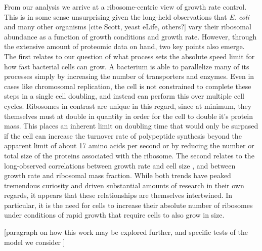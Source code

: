 From our analysis we arrive at a ribosome-centric view of growth rate control.
This is in some sense unsurprising  given the long-held observations that
\textit{E. coli} and many other organisms [cite Scott, yeast eLife, others?]
vary their ribosomal abundance as a function of growth conditions and growth
rate. However, through the extensive amount of proteomic data on hand, two key
points also emerge. The first relates to our question of what process sets the
absolute speed limit for how fast bacterial cells can grow.  A bacterium is able
to parallelize many of its processes simply by increasing the number of
transporters and  enzymes.  Even in cases like chromosomal replication, the cell
is not constrained to complete these steps in a single cell doubling, and
instead can perform this over multiple  cell cycles. Ribosomes in contrast are
unique in this regard, since at minimum, they themselves  must at double in
quantity in order for the cell to double it's protein mass. This places an
inherent limit on doubling time that would only be surpased if the cell can
increase the turnover rate of   polypeptide synthesis beyond the apparent limit
of about 17 amino acids per second  or by reducing the number or total size of
the proteins associated with the ribosome. The second relates to the
long-observed correlations between growth rate and cell size
\citep{schaechter1958, si2017}, and between growth rate and ribosomal mass
fraction. While both trends have peaked tremendous curiosity and driven
substantial amounts of research in their own regards, it appears  that
these relationships are themselves intertwined. In particular, it is the need
for cells to increase their absolute number of ribosomes under conditions of
rapid growth that require cells to also grow in size.



[paragraph on how this work may be explored further, and specific tests of the model we consider ]

%
%
%
%
%
%



